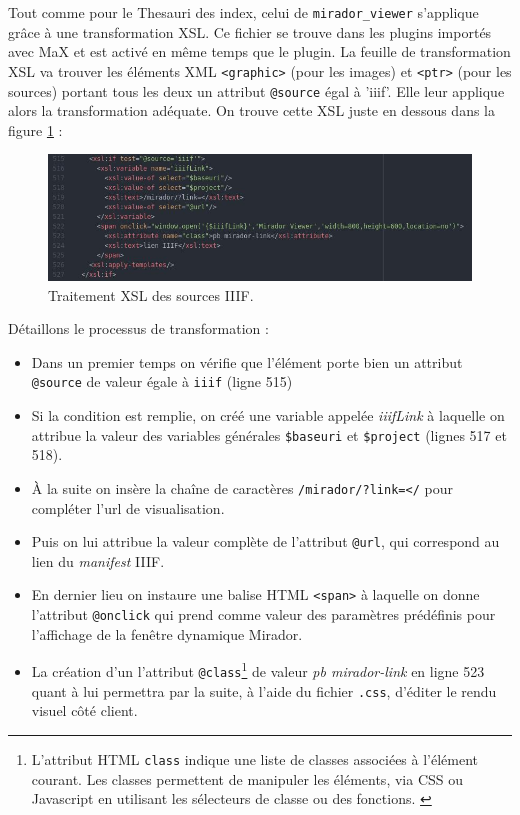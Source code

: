 \documentclass[a4paper,12pt,twoside]{book}
\begin{document}
Tout comme pour le Thesauri des index, celui de \texttt{mirador\_viewer} s'applique grâce à une transformation \acrshort{XSL}. Ce fichier se trouve dans les plugins importés avec MaX et est activé en même temps que le plugin. La feuille de transformation \acrshort{XSL} va trouver les éléments XML \texttt{<graphic>} (pour les images) et \texttt{<ptr>} (pour les sources) portant tous les deux un attribut \texttt{@source} égal à 'iiif'. Elle leur applique alors la transformation adéquate. On trouve cette \acrshort{XSL} juste en dessous dans la figure \ref{xsl:_mirador} :


\begin{figure}[H]
    \centering
    \includegraphics[width=15cm]{img/partie_3/xsl_mirador.JPG}
    \caption{Traitement \acrshort{XSL} des sources \acrshort{IIIF}.}
    \label{xsl:_mirador}
\end{figure}

Détaillons le processus de transformation :
\begin{itemize}
    \item Dans un premier temps on vérifie que l'élément porte bien un attribut \texttt{@source} de valeur égale à \texttt{iiif} (ligne 515)
    \item Si la condition est remplie, on créé une variable appelée \textit{iiifLink} à laquelle on attribue la valeur des variables générales \texttt{\$baseuri} et \texttt{\$project} (lignes 517 et 518).
    \item À la suite on insère la chaîne de caractères \texttt{/mirador/?link=</} pour compléter l'url de visualisation.
    \item Puis on lui attribue la valeur complète de l'attribut \texttt{@url}, qui correspond au lien du \textit{manifest} \acrshort{IIIF}.
    \item En dernier lieu on instaure une balise \acrshort{HTML} \texttt{<span>} à laquelle on donne l'attribut \texttt{@onclick} qui prend comme valeur des paramètres prédéfinis pour l'affichage de la fenêtre dynamique Mirador.
    \item La création d'un l'attribut \texttt{@class}\footnote{L'attribut HTML \texttt{class} indique une liste de classes associées à l'élément courant. Les classes permettent de manipuler les éléments, via \acrshort{CSS} ou Javascript en utilisant les sélecteurs de classe ou des fonctions. \cite{class}} de valeur \textit{pb mirador-link} en ligne 523 quant à lui permettra par la suite, à l'aide du fichier \texttt{.css}, d'éditer le rendu visuel côté client.
\end{itemize}
\end{document}
